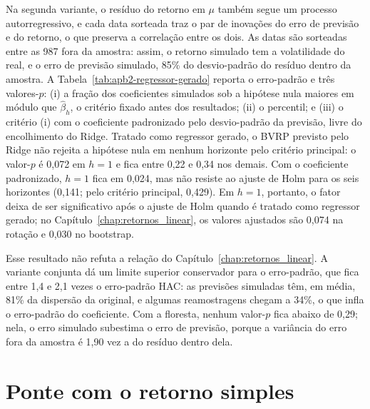 

Na segunda variante, o resíduo do retorno em $\mu$ também segue um processo
autorregressivo, e cada data sorteada traz o par de inovações do erro de
previsão e do retorno, o que preserva a correlação entre os dois. As datas
são sorteadas entre as 987 fora da amostra: assim, o retorno simulado tem a
volatilidade do real, e o erro de previsão simulado, 85\% do desvio-padrão do
resíduo dentro da amostra. A Tabela~\ref{tab:apb2-regressor-gerado} reporta o erro-padrão e três
valores-$p$: (i) a fração dos coeficientes simulados sob a hipótese nula
maiores em módulo que $\hat\beta_h$, o critério fixado antes dos resultados;
(ii) o percentil; e (iii) o critério (i) com o coeficiente padronizado pelo
desvio-padrão da previsão, livre do encolhimento do Ridge. Tratado como
regressor gerado, o BVRP previsto pelo Ridge não rejeita a hipótese nula em
nenhum horizonte pelo critério principal: o valor-$p$ é 0,072 em $h = 1$ e
fica entre 0,22 e 0,34 nos demais. Com o coeficiente padronizado, $h = 1$ fica
em 0,024, mas não resiste ao ajuste de Holm para os seis horizontes (0,141;
pelo critério principal, 0,429). Em $h = 1$, portanto, o fator deixa de ser
significativo após o ajuste de Holm quando é tratado como regressor gerado;
no Capítulo~\ref{chap:retornos_linear}, os valores ajustados são 0,074 na
rotação e 0,030 no bootstrap.



Esse resultado não refuta a relação do Capítulo~\ref{chap:retornos_linear}. A
variante conjunta dá um limite superior conservador para o erro-padrão, que
fica entre 1,4 e 2,1 vezes o erro-padrão HAC: as previsões simuladas têm, em
média, 81\% da dispersão da original, e algumas reamostragens chegam a 34\%, o
que infla o erro-padrão do coeficiente. Com a floresta, nenhum valor-$p$ fica
abaixo de 0,29; nela, o erro simulado subestima o erro de previsão, porque a
variância do erro fora da amostra é 1,90 vez a do resíduo dentro dela.

\section{Ponte com o retorno simples}
\label{sec:apb2-ponte}

